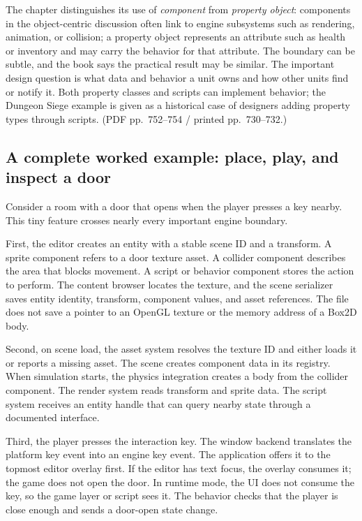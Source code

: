 The chapter distinguishes its use of \emph{component} from \emph{property object}: components in the object-centric discussion often link to engine subsystems such as rendering, animation, or collision; a property object represents an attribute such as health or inventory and may carry the behavior for that attribute. The boundary can be subtle, and the book says the practical result may be similar. The important design question is what data and behavior a unit owns and how other units find or notify it. Both property classes and scripts can implement behavior; the Dungeon Siege example is given as a historical case of designers adding property types through scripts. (PDF pp.~752--754 / printed pp.~730--732.)

\subsection{A complete worked example: place, play, and inspect a door}\label{06-engine-ii-ch041-a-complete-worked-example-place-play-and-inspect-a-door}

Consider a room with a door that opens when the player presses a key nearby. This tiny feature crosses nearly every important engine boundary.

First, the editor creates an entity with a stable scene ID and a transform. A sprite component refers to a door texture asset. A collider component describes the area that blocks movement. A script or behavior component stores the action to perform. The content browser locates the texture, and the scene serializer saves entity identity, transform, component values, and asset references. The file does not save a pointer to an OpenGL texture or the memory address of a Box2D body.

Second, on scene load, the asset system resolves the texture ID and either loads it or reports a missing asset. The scene creates component data in its registry. When simulation starts, the physics integration creates a body from the collider component. The render system reads transform and sprite data. The script system receives an entity handle that can query nearby state through a documented interface.

Third, the player presses the interaction key. The window backend translates the platform key event into an engine key event. The application offers it to the topmost editor overlay first. If the editor has text focus, the overlay consumes it; the game does not open the door. In runtime mode, the UI does not consume the key, so the game layer or script sees it. The behavior checks that the player is close enough and sends a door-open state change.

